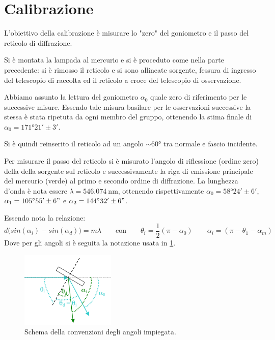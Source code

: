 \section{Calibrazione}
	L'obiettivo della calibrazione è misurare lo "zero" del goniometro e il passo del reticolo di diffrazione.
	
	Si è montata la lampada al mercurio e si è proceduto come nella parte precedente:
	si è rimosso il reticolo e si sono allineate sorgente, fessura di ingresso del telescopio di raccolta
	ed il reticolo a croce del telescopio di osservazione.
	
	Abbiamo assunto la lettura del goniometro
	$\alpha_0$ quale zero di riferimento per le successive misure.
	Essendo tale misura basilare per le osservazioni successive la stessa è stata ripetuta da ogni membro del gruppo,
	ottenendo la stima finale di $\alpha_0 = \ang{171;21; } \pm 3' $.
	
	Si è quindi reinserito il reticolo ad un angolo $\sim \ang{60}$
	tra normale e fascio incidente.

	Per misurare il passo del reticolo si è misurato l'angolo di riflessione (ordine zero) della della sorgente sul reticolo e successivamente la riga di emissione principale del mercurio (verde) al 
	primo e secondo ordine di diffrazione. La lunghezza d'onda è nota essere $\lambda = \SI{546.074}{\nano\meter}$,
	ottenendo rispettivamente $\alpha_0=\ang{58;24;} \pm 6'$, $\alpha_1=\ang{105;55;}\pm 6"$ e $\alpha_2=\ang{144;32;}\pm 6"$.
	
	Essendo nota la relazione:
	\smallskip
	\begin{equation*}
	d\bigl(sin (\alpha_i) - sin (\alpha_d)\bigr) = m \lambda\qquad \text{con}\qquad \theta_i=\frac{1}{2}(\pi- \alpha_0)\qquad \alpha_i=(\pi- \theta_1-\alpha_m)
	\end{equation*}
	Dove per gli angoli si è seguita la notazione usata in \figurename{ \ref{fig:angoli}}.
	\bigskip
	\begin{figure} [H]
		\centering
		\includegraphics[width=0.4\textwidth]{../FIgs-tabs/angoli.png}
		\caption{Schema della convenzioni degli angoli impiegata.}
		\label{fig:angoli}
	\end{figure}
	\smallskip

